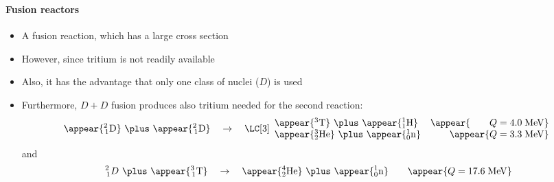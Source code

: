 \begin{frame}
\frametitle{\texorpdfstring{\culine[\sectiontitleulinecolor]{\sectiontitle}}{\sectiontitle} }
\framesubtitle{Fusion reactors}

% 
\begin{itemize}
	\item A fusion reaction, which has a large cross section  
	
	\item However, since tritium is not readily available
	
	\item Also, it has the advantage that only one class of nuclei ($D$) is used 
	
	\item Furthermore, $D+D$ fusion produces also tritium needed for the second reaction:
	$$
\appear{{ }_{\,1}^{2} \mathrm{D}}  ~\plus~ \appear{{ }_{\,1}^{2} \mathrm{D}} \quad \rightarrow \quad 
\LC[3] \begin{array}{ll} \appear{{ }^{3} \mathrm{T}} ~\plus~ \appear{{ }_{1}^{1} \mathrm{H}} & \appear{\qquad Q=4.0 \mathrm{\;MeV}} \\ \appear{{ }_{2}^{3} \mathrm{He}}  ~\plus~ \appear{{ }_{0}^{1} \mathrm{n}} & \qquad \appear{Q=3.3 \mathrm{\;MeV}} 
\end{array}
$$
and 
\[
{ }_{\,1}^{2} D  ~\plus~ \appear{{ }_{\,1}^{3} \mathrm{T}} \quad \rightarrow \quad \appear{{ }_{2}^{4} \mathrm{He}}  ~\plus~ \appear{{ }_{0}^{1} \mathrm{n}} \qquad \appear{Q=17.6 \mathrm{\;MeV}}
\]

\end{itemize}


\endofslide 
\end{frame}

